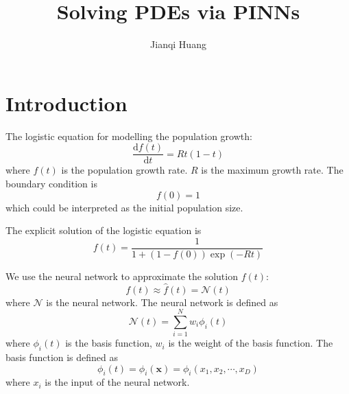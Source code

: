 \documentclass[11pt,a4paper]{article}
\begin{document}
\author{Jianqi Huang}
\title{Solving PDEs via PINNs}
\maketitle
\section{Introduction}
The logistic equation for modelling the population growth: 
\begin{equation}
    \frac{\mathrm{d}f(t)}{\mathrm{d}t} = R t(1-t)
\end{equation}
where $f(t)$ is the population growth rate. $R$ is the maximum growth rate. The boundary condition is 
\begin{equation}
    f(0) = 1 
\end{equation}
which could be interpreted as the initial population size. 

The explicit solution of the logistic equation is
\begin{equation}
    f(t) = \frac{1}{1 + (1 - f(0)) \exp(-Rt)}
\end{equation}

We use the neural network to approximate the solution $f(t)$:
\begin{equation}
    f(t) \approx \hat{f}(t) = \mathcal{N}(t)
\end{equation}
where $\mathcal{N}$ is the neural network. The neural network is defined as
\begin{equation}
    \mathcal{N}(t) = \sum_{i=1}^{N} w_i \phi_i(t)
\end{equation}
where $\phi_i(t)$ is the basis function, $w_i$ is the weight of the basis function. The basis function is defined as
\begin{equation}
    \phi_i(t) = \phi_i(\mathbf{x}) = \phi_i(x_1, x_2, \cdots, x_D)
\end{equation}
where $x_i$ is the input of the neural network. 
\end{document}
